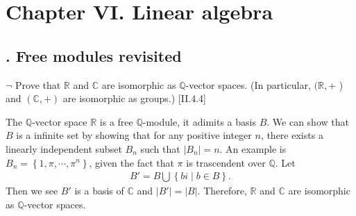 \section{Chapter VI.\hspace{0.2em} Linear algebra}
\subsection{. Free modules revisited}
\hypertarget{Exercise VI.1.1}{}
\begin{problem}[1.1]
	$\neg$ Prove that $\mathbb{R}$ and $\mathbb{C}$ are isomorphic as $\mathbb{Q}$-vector spaces. (In particular, $(\mathbb{R},+$ ) and $(\mathbb{C},+)$ are isomorphic as groups.) [II.4.4]
\end{problem}
\begin{solution}
The $\mathbb{Q}$-vector space $\mathbb{R}$ is a free $\mathbb{Q}$-module, it adimits a basis $B$. We can show that $B$ is a infinite set by showing that for any positive integer $n$, there exists a linearly independent subset $B_n$ such that $|B_n|=n$. An example is $B_n=\left\{1,\pi,\cdots,\pi^n\right\}$, given the fact that $\pi$ is trascendent over $\mathbb{Q}$. Let
\begin{align*}
	B'=B\bigcup \left\{bi\mid b\in B\right\}.
\end{align*}
Then we see $B'$ is a basis of $\mathbb{C}$ and $|B'|=|B|$. Therefore, $\mathbb{R}$ and $\mathbb{C}$ are isomorphic as $\mathbb{Q}$-vector spaces.
\end{solution}

